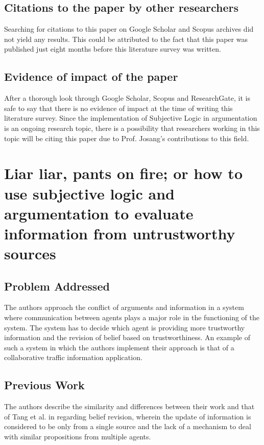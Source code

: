 \documentclass[UTF8]{article}
\begin{document}
\subsection{Citations to the paper by other researchers}
Searching for citations to this paper on Google Scholar and Scopus archives did not yield any results. This could be attributed to the fact that this paper was published just eight months before this literature survey was written.

\subsection{Evidence of impact of the paper}
After a thorough look through Google Scholar, Scopus and ResearchGate, it is safe to say that there is no evidence of impact at the time of writing this literature survey. Since the implementation of Subjective Logic in argumentation is an ongoing research topic, there is a possibility that researchers working in this topic will be citing this paper due to Prof. Josang's contributions to this field.

\section{Liar liar, pants on fire; or how to use subjective logic and argumentation to
evaluate information from untrustworthy sources}

\subsection{Problem Addressed}
The authors approach the conflict of arguments and information in a system where communication between agents plays
a major role in the functioning of the system. The system has to decide which agent is providing more trustworthy information
and the revision of belief based on trustworthiness. 
An example of such a system in which the authors implement their approach 
is that of a collaborative traffic information application. 

\subsection{Previous Work}
The authors describe the similarity and differences between their work and that of Tang et al. in \cite{Tang2012UsingAT} regarding belief revision, wherein the update of information is considered
to be only from a single source and the lack of a mechanism to deal with similar propositions from multiple agents. 
\end{document}
